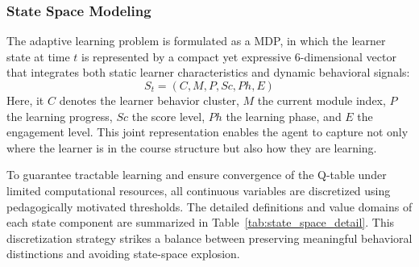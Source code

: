 \documentclass[9pt, conference, a4paper, compsocconf]{IEEEtran}
\begin{document}
\subsubsection{State Space Modeling}
The adaptive learning problem is formulated as a MDP, in which the learner state at time $t$ is represented by a compact yet expressive 6-dimensional vector that integrates both static learner characteristics and dynamic behavioral signals:
\begin{equation}
S_t = (C, M, P, Sc, Ph, E)
\end{equation}
Here, it $C$ denotes the learner behavior cluster, $M$ the current module index, $P$ the learning progress, $Sc$ the score level, $Ph$ the learning phase, and $E$ the engagement level. This joint representation enables the agent to capture not only where the learner is in the course structure but also how they are learning.

To guarantee tractable learning and ensure convergence of the Q-table under limited computational resources, all continuous variables are discretized using pedagogically motivated thresholds. The detailed definitions and value domains of each state component are summarized in Table~\ref{tab:state_space_detail}. This discretization strategy strikes a balance between preserving meaningful behavioral distinctions and avoiding state-space explosion.
\end{document}
